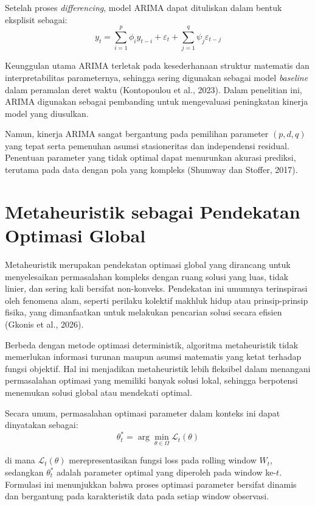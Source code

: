 \noindent Setelah proses \textit{differencing}, model ARIMA dapat dituliskan dalam bentuk eksplisit sebagai:
\begin{equation}
    y_t = \sum_{i=1}^{p} \phi_i y_{t-i} + \varepsilon_t + \sum_{j=1}^{q} \psi_j \varepsilon_{t-j}
    \label{eq:arima_explicit}
\end{equation}

Keunggulan utama ARIMA terletak pada kesederhanaan struktur matematis dan interpretabilitas parameternya, sehingga sering digunakan sebagai model \textit{baseline} dalam peramalan deret waktu (Kontopoulou et al., 2023). Dalam penelitian ini, ARIMA digunakan sebagai pembanding untuk mengevaluasi peningkatan kinerja model yang diusulkan.

Namun, kinerja ARIMA sangat bergantung pada pemilihan parameter $(p,d,q)$ yang tepat serta pemenuhan asumsi stasioneritas dan independensi residual. Penentuan parameter yang tidak optimal dapat menurunkan akurasi prediksi, terutama pada data dengan pola yang kompleks (Shumway dan Stoffer, 2017).


\section{Metaheuristik sebagai Pendekatan Optimasi Global}

\noindent Metaheuristik merupakan pendekatan optimasi global yang dirancang untuk menyelesaikan permasalahan kompleks dengan ruang solusi yang luas, tidak linier, dan sering kali bersifat non-konveks. Pendekatan ini umumnya terinspirasi oleh fenomena alam, seperti perilaku kolektif makhluk hidup atau prinsip-prinsip fisika, yang dimanfaatkan untuk melakukan pencarian solusi secara efisien (Gkonis et al., 2026).

Berbeda dengan metode optimasi deterministik, algoritma metaheuristik tidak memerlukan informasi turunan maupun asumsi matematis yang ketat terhadap fungsi objektif. Hal ini menjadikan metaheuristik lebih fleksibel dalam menangani permasalahan optimasi yang memiliki banyak solusi lokal, sehingga berpotensi menemukan solusi global atau mendekati optimal.


Secara umum, permasalahan optimasi parameter dalam konteks ini dapat dinyatakan sebagai:
\begin{equation}
    \theta_t^* = \arg \min_{\theta \in \Omega} \mathcal{L}_t(\theta)
    \label{eq: optimasi_param}
\end{equation}


di mana $\mathcal{L}_t(\theta)$ merepresentasikan fungsi loss pada rolling window $W_t$, sedangkan $\theta_t^*$ adalah parameter optimal yang diperoleh pada window ke-$t$. Formulasi ini menunjukkan bahwa proses optimasi parameter bersifat dinamis dan bergantung pada karakteristik data pada setiap window observasi.

